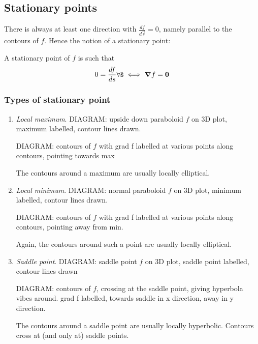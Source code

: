 \documentclass{../template/note}
\begin{document}
    \subsection{Stationary points}

    There is always at least one direction with \(\frac{df}{d \vec s} = 0\), namely parallel to the contours of \(f\). Hence the notion of a stationary point:

    \begin{definition}
        A stationary point of \(f\) is such that
        \[
            0 = \frac{df}{ds} \forall \hvec s \iff \grad f = \vec 0
        \]
    \end{definition}

    \subsubsection{Types of stationary point}

    \begin{enumerate}[label=\protect\circled{\arabic*}]
        \item \emph{Local maximum}.
        DIAGRAM: upside down paraboloid \(f\) on 3D plot, maximum labelled, contour lines drawn.

        DIAGRAM: contours of \(f\) with grad f labelled at various points along contours, pointing towards max

        The contours around a maximum are usually locally elliptical.
        \item \emph{Local minimum}.
        DIAGRAM: normal paraboloid \(f\) on 3D plot, minimum labelled, contour lines drawn.

        DIAGRAM: contours of \(f\) with grad f labelled at various points along contours, pointing away from min.

        Again, the contours around such a point are usually locally elliptical.
        \item \emph{Saddle point}. 
        DIAGRAM: saddle point \(f\) on 3D plot, saddle point labelled, contour lines drawn

        DIAGRAM: contours of \(f\), crossing at the saddle point, giving hyperbola vibes around. grad f labelled, towards saddle in x direction, away in y direction.

        The contours around a saddle point are usually locally hyperbolic. Contours cross at (and only at) saddle points.
    \end{enumerate}
    
\end{document}
